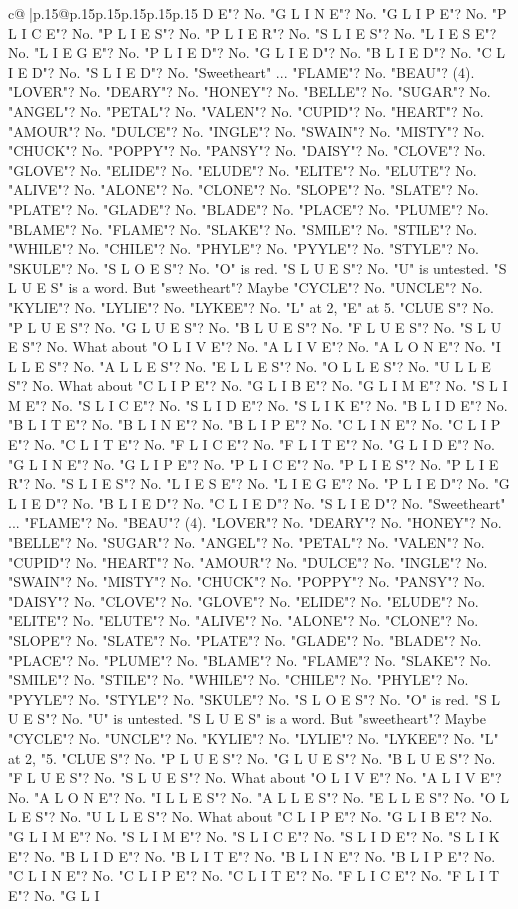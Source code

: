 \documentclass{article}
\begin{document}
{\begin{supertabular}{c@{$\;$}|p{.15\linewidth}@{}p{.15\linewidth}p{.15\linewidth}p{.15\linewidth}p{.15\linewidth}p{.15\linewidth}}
{{{D E"? No. "G L I N E"? No. "G L I P E"? No. "P L I C E"? No. "P L I E S"? No. "P L I E R"? No. "S L I E S"? No. "L I E S E"? No. "L I E G E"? No. "P L I E D"? No. "G L I E D"? No. "B L I E D"? No. "C L I E D"? No. "S L I E D"? No. "Sweetheart" ... "FLAME"? No. "BEAU"? (4). "LOVER"? No. "DEARY"? No. "HONEY"? No. "BELLE"? No. "SUGAR"? No. "ANGEL"? No. "PETAL"? No. "VALEN"? No. "CUPID"? No. "HEART"? No. "AMOUR"? No. "DULCE"? No. "INGLE"? No. "SWAIN"? No. "MISTY"? No. "CHUCK"? No. "POPPY"? No. "PANSY"? No. "DAISY"? No. "CLOVE"? No. "GLOVE"? No. "ELIDE"? No. "ELUDE"? No. "ELITE"? No. "ELUTE"? No. "ALIVE"? No. "ALONE"? No. "CLONE"? No. "SLOPE"? No. "SLATE"? No. "PLATE"? No. "GLADE"? No. "BLADE"? No. "PLACE"? No. "PLUME"? No. "BLAME"? No. "FLAME"? No. "SLAKE"? No. "SMILE"? No. "STILE"? No. "WHILE"? No. "CHILE"? No. "PHYLE"? No. "PYYLE"? No. "STYLE"? No. "SKULE"? No. "S L O E S"? No. "O" is red. "S L U E S"? No. "U" is untested. "S L U E S" is a word. But "sweetheart"? Maybe "CYCLE"? No. "UNCLE"? No. "KYLIE"? No. "LYLIE"? No. "LYKEE"? No. "L" at 2, "E" at 5. "CLUE S"? No. "P L U E S"? No. "G L U E S"? No. "B L U E S"? No. "F L U E S"? No. "S L U E S"? No. What about "O L I V E"? No. "A L I V E"? No. "A L O N E"? No. "I L L E S"? No. "A L L E S"? No. "E L L E S"? No. "O L L E S"? No. "U L L E S"? No. What about "C L I P E"? No. "G L I B E"? No. "G L I M E"? No. "S L I M E"? No. "S L I C E"? No. "S L I D E"? No. "S L I K E"? No. "B L I D E"? No. "B L I T E"? No. "B L I N E"? No. "B L I P E"? No. "C L I N E"? No. "C L I P E"? No. "C L I T E"? No. "F L I C E"? No. "F L I T E"? No. "G L I D E"? No. "G L I N E"? No. "G L I P E"? No. "P L I C E"? No. "P L I E S"? No. "P L I E R"? No. "S L I E S"? No. "L I E S E"? No. "L I E G E"? No. "P L I E D"? No. "G L I E D"? No. "B L I E D"? No. "C L I E D"? No. "S L I E D"? No. "Sweetheart" ... "FLAME"? No. "BEAU"? (4). "LOVER"? No. "DEARY"? No. "HONEY"? No. "BELLE"? No. "SUGAR"? No. "ANGEL"? No. "PETAL"? No. "VALEN"? No. "CUPID"? No. "HEART"? No. "AMOUR"? No. "DULCE"? No. "INGLE"? No. "SWAIN"? No. "MISTY"? No. "CHUCK"? No. "POPPY"? No. "PANSY"? No. "DAISY"? No. "CLOVE"? No. "GLOVE"? No. "ELIDE"? No. "ELUDE"? No. "ELITE"? No. "ELUTE"? No. "ALIVE"? No. "ALONE"? No. "CLONE"? No. "SLOPE"? No. "SLATE"? No. "PLATE"? No. "GLADE"? No. "BLADE"? No. "PLACE"? No. "PLUME"? No. "BLAME"? No. "FLAME"? No. "SLAKE"? No. "SMILE"? No. "STILE"? No. "WHILE"? No. "CHILE"? No. "PHYLE"? No. "PYYLE"? No. "STYLE"? No. "SKULE"? No. "S L O E S"? No. "O" is red. "S L U E S"? No. "U" is untested. "S L U E S" is a word. But "sweetheart"? Maybe "CYCLE"? No. "UNCLE"? No. "KYLIE"? No. "LYLIE"? No. "LYKEE"? No. "L" at 2, "5. "CLUE S"? No. "P L U E S"? No. "G L U E S"? No. "B L U E S"? No. "F L U E S"? No. "S L U E S"? No. What about "O L I V E"? No. "A L I V E"? No. "A L O N E"? No. "I L L E S"? No. "A L L E S"? No. "E L L E S"? No. "O L L E S"? No. "U L L E S"? No. What about "C L I P E"? No. "G L I B E"? No. "G L I M E"? No. "S L I M E"? No. "S L I C E"? No. "S L I D E"? No. "S L I K E"? No. "B L I D E"? No. "B L I T E"? No. "B L I N E"? No. "B L I P E"? No. "C L I N E"? No. "C L I P E"? No. "C L I T E"? No. "F L I C E"? No. "F L I T E"? No. "G L I }}}
\end{supertabular}}
\end{document}
